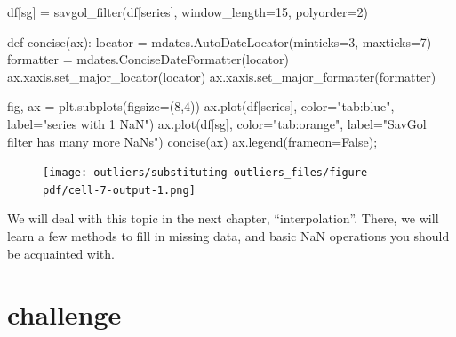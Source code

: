 \documentclass[
  letterpaper,
  DIV=11,
  numbers=noendperiod,
  oneside]{scrreprt}
\newenvironment{Shaded}{\begin{snugshade}}{\end{snugshade}}
\newcommand{\DecValTok}[1]{\textcolor[rgb]{0.68,0.00,0.00}{#1}}
\newcommand{\KeywordTok}[1]{\textcolor[rgb]{0.00,0.23,0.31}{#1}}
\newcommand{\NormalTok}[1]{\textcolor[rgb]{0.00,0.23,0.31}{#1}}
\newcommand{\OperatorTok}[1]{\textcolor[rgb]{0.37,0.37,0.37}{#1}}
\newcommand{\StringTok}[1]{\textcolor[rgb]{0.13,0.47,0.30}{#1}}
\newcommand{\VariableTok}[1]{\textcolor[rgb]{0.07,0.07,0.07}{#1}}
\begin{document}
\begin{Shaded}
\begin{Highlighting}[]
\NormalTok{df[}\StringTok{\textquotesingle{}sg\textquotesingle{}}\NormalTok{] }\OperatorTok{=}\NormalTok{ savgol\_filter(df[}\StringTok{\textquotesingle{}series\textquotesingle{}}\NormalTok{], window\_length}\OperatorTok{=}\DecValTok{15}\NormalTok{, polyorder}\OperatorTok{=}\DecValTok{2}\NormalTok{)}

\KeywordTok{def}\NormalTok{ concise(ax):}
\NormalTok{    locator }\OperatorTok{=}\NormalTok{ mdates.AutoDateLocator(minticks}\OperatorTok{=}\DecValTok{3}\NormalTok{, maxticks}\OperatorTok{=}\DecValTok{7}\NormalTok{)}
\NormalTok{    formatter }\OperatorTok{=}\NormalTok{ mdates.ConciseDateFormatter(locator)}
\NormalTok{    ax.xaxis.set\_major\_locator(locator)}
\NormalTok{    ax.xaxis.set\_major\_formatter(formatter)}

\NormalTok{fig, ax }\OperatorTok{=}\NormalTok{ plt.subplots(figsize}\OperatorTok{=}\NormalTok{(}\DecValTok{8}\NormalTok{,}\DecValTok{4}\NormalTok{))}
\NormalTok{ax.plot(df[}\StringTok{\textquotesingle{}series\textquotesingle{}}\NormalTok{], color}\OperatorTok{=}\StringTok{"tab:blue"}\NormalTok{, label}\OperatorTok{=}\StringTok{"series with 1 NaN"}\NormalTok{)}
\NormalTok{ax.plot(df[}\StringTok{\textquotesingle{}sg\textquotesingle{}}\NormalTok{], color}\OperatorTok{=}\StringTok{"tab:orange"}\NormalTok{, label}\OperatorTok{=}\StringTok{"SavGol filter has many more NaNs"}\NormalTok{)}
\NormalTok{concise(ax)}
\NormalTok{ax.legend(frameon}\OperatorTok{=}\VariableTok{False}\NormalTok{)}\OperatorTok{;}
\end{Highlighting}
\end{Shaded}

\begin{figure}[H]

{\centering \texttt{[image: outliers/substituting-outliers\_files/figure-pdf/cell-7-output-1.png]}

}

\end{figure}

We will deal with this topic in the next chapter, ``interpolation''.
There, we will learn a few methods to fill in missing data, and basic
NaN operations you should be acquainted with.

\hypertarget{challenge}{%
\chapter{challenge}\label{challenge}}
\end{document}
